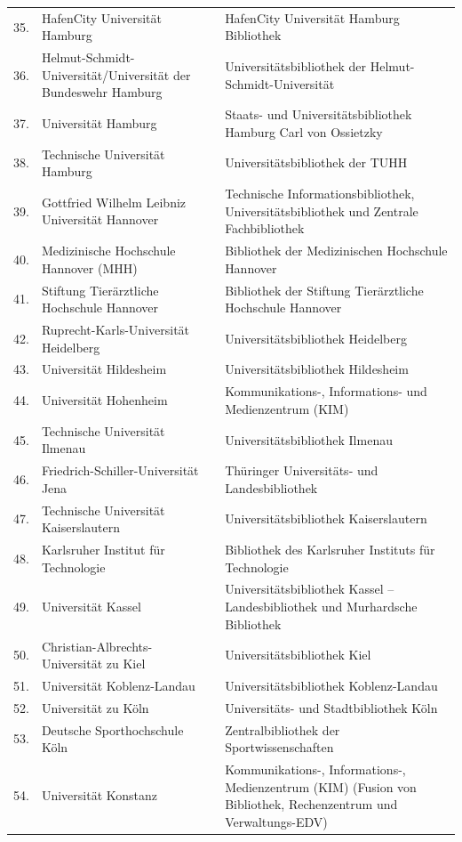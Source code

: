 \documentclass[a4paper,
fontsize=11pt,
oneside,
numbers=noperiodatend,
parskip=half-,
bibliography=totoc,
final
]{scrartcl}
\begin{document}
\begin{longtable}[l]{rp{7cm}p{7.5cm}}
35. & HafenCity Universität Hamburg & HafenCity Universität Hamburg Bibliothek \\
36. & Helmut-Schmidt-Universität/Universität der Bundeswehr Hamburg & Universitätsbibliothek der Helmut-Schmidt-Universität \\
37. & Universität Hamburg & Staats- und Universitätsbibliothek Hamburg Carl von Ossietzky \\
38. & Technische Universität Hamburg & Universitätsbibliothek der TUHH \\
39. & Gottfried Wilhelm Leibniz Universität Hannover & Technische Informationsbibliothek, Universitätsbibliothek und Zentrale Fachbibliothek \\
40. & Medizinische Hochschule Hannover (MHH) & Bibliothek der Medizinischen Hochschule Hannover \\
41. & Stiftung Tierärztliche Hochschule Hannover & Bibliothek der Stiftung Tierärztliche Hochschule Hannover \\
42. & Ruprecht-Karls-Universität Heidelberg & Universitätsbibliothek Heidelberg \\
43. & Universität Hildesheim & Universitätsbibliothek Hildesheim \\
44. & Universität Hohenheim & Kommunikations-, Informations- und Medienzentrum (KIM) \\
45. & Technische Universität Ilmenau & Universitätsbibliothek Ilmenau \\
46. & Friedrich-Schiller-Universität Jena & Thüringer Universitäts- und Landesbibliothek \\
47. & Technische Universität Kaiserslautern & Universitätsbibliothek Kaiserslautern \\
48. & Karlsruher Institut für Technologie & Bibliothek des Karlsruher Instituts für Technologie \\
49. & Universität Kassel & Universitätsbibliothek Kassel -- Landesbibliothek und Murhardsche Bibliothek \\
50. & Christian-Albrechts-Universität zu Kiel & Universitätsbibliothek Kiel \\
51. & Universität Koblenz-Landau & Universitätsbibliothek Koblenz-Landau \\
52. & Universität zu Köln & Universitäts- und Stadtbibliothek Köln \\
53. & Deutsche Sporthochschule Köln & Zentralbibliothek der Sportwissenschaften \\
54. & Universität Konstanz & Kommunikations-, Informations-, Medienzentrum (KIM) (Fusion von Bibliothek, Rechenzentrum und Verwaltungs-EDV) \\

\end{longtable}
\end{document}
